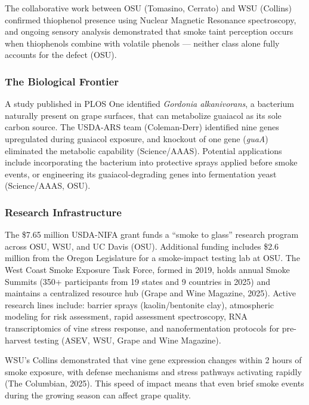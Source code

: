 \documentclass[11pt,letterpaper]{article}
\begin{document}
The collaborative work between OSU (Tomasino, Cerrato) and WSU (Collins) confirmed thiophenol presence using Nuclear Magnetic Resonance spectroscopy, and ongoing sensory analysis demonstrated that smoke taint perception occurs when thiophenols combine with volatile phenols --- neither class alone fully accounts for the defect (OSU).

\subsubsection{The Biological Frontier}

A study published in PLOS One identified \textit{Gordonia alkanivorans}, a bacterium naturally present on grape surfaces, that can metabolize guaiacol as its sole carbon source. The USDA-ARS team (Coleman-Derr) identified nine genes upregulated during guaiacol exposure, and knockout of one gene (\textit{guaA}) eliminated the metabolic capability (Science/AAAS). Potential applications include incorporating the bacterium into protective sprays applied before smoke events, or engineering its guaiacol-degrading genes into fermentation yeast (Science/AAAS, OSU).

\subsubsection{Research Infrastructure}

The \$7.65 million USDA-NIFA grant funds a ``smoke to glass'' research program across OSU, WSU, and UC Davis (OSU). Additional funding includes \$2.6 million from the Oregon Legislature for a smoke-impact testing lab at OSU. The West Coast Smoke Exposure Task Force, formed in 2019, holds annual Smoke Summits (350+ participants from 19 states and 9 countries in 2025) and maintains a centralized resource hub (Grape and Wine Magazine, 2025). Active research lines include: barrier sprays (kaolin/bentonite clay), atmospheric modeling for risk assessment, rapid assessment spectroscopy, RNA transcriptomics of vine stress response, and nanofermentation protocols for pre-harvest testing (ASEV, WSU, Grape and Wine Magazine).

WSU's Collins demonstrated that vine gene expression changes within 2 hours of smoke exposure, with defense mechanisms and stress pathways activating rapidly (The Columbian, 2025). This speed of impact means that even brief smoke events during the growing season can affect grape quality.

\newpage
\end{document}
